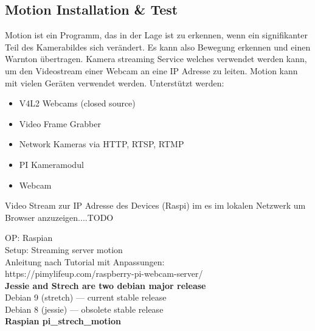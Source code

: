 \subsection{Motion Installation \& Test}

Motion ist ein Programm, das in der Lage ist zu erkennen, wenn ein signifikanter Teil des Kamerabildes sich verändert. Es kann also 
Bewegung erkennen und einen Warnton übertragen. Kamera streaming 
Service welches verwendet werden kann, um den Videostream 
einer Webcam an eine IP Adresse zu leiten. Motion kann mit 
vielen Geräten verwendet werden. Unterstützt werden:
\begin{itemize}
\item V4L2 Webcams (closed source)
\item Video Frame Grabber
\item Network Kameras via HTTP, RTSP, RTMP
\item PI Kameramodul
\item Webcam
\end{itemize}

Video Stream zur IP Adresse des Devices (Raspi) im es im lokalen 
Netzwerk um Browser anzuzeigen....TODO

OP: Raspian\\
Setup: Streaming server motion\\

Anleitung nach Tutorial mit Anpassungen:\\
https://pimylifeup.com/raspberry-pi-webcam-server/\\

\textbf{Jessie and Strech are two debian major release}\\
Debian 9 (stretch) — current stable release\\
Debian 8 (jessie) — obsolete stable release\\

\textbf{Raspian pi\_strech\_motion}

